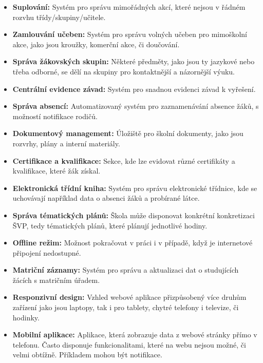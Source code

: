\documentclass[FM,Proj]{tulthesis}
\begin{document}
\begin{itemize}
    \item \textbf{Suplování:} Systém pro správu mimořádných akcí, které nejsou v řádném rozvhu třídy/skupiny/učitele.
    
    \item \textbf{Zamlouvání učeben:} Systém pro správu volných učeben pro mimoškolní akce, jako jsou kroužky, komerční
    akce, či doučování.
    
    \item \textbf{Správa žákovských skupin:} Některé předměty, jako jsou ty jazykové nebo třeba odborné, se dělí na skupiny pro 
    kontaktnější a názornější výuku.
    
    \item \textbf{Centrální evidence závad:} Systém pro snadnou evidenci závad k vyřešení.

    \item \textbf{Správa absencí:} Automatizovaný systém pro zaznamenávání absence žáků, s možností notifikace rodičů.
    
    \item \textbf{Dokumentový management:} Úložiště pro školní dokumenty, jako jsou rozvrhy, plány a interní materiály.
    
    \item \textbf{Certifikace a kvalifikace:} Sekce, kde lze evidovat různé certifikáty a kvalifikace, které žák získal.

    \item \textbf{Elektronická třídní kniha:} Systém pro správu elektronické třídnice, kde se uchovávají například data 
    o absenci žáků a probírané látce.

    \item \textbf{Správa tématických plánů:} Škola může disponovat konkrétní konkretizaci ŠVP, tedy tématických plánů,
    které plánují jednotlivé hodiny.
    
    \item \textbf{Offline režim:} Možnost pokračovat v práci i v případě, když je internetové připojení nedostupné.

    \item \textbf{Matriční záznamy:} Systém pro správu a aktualizaci dat o studujících žácích s matričním úřadem.

    \item \textbf{Responzivní design:} Vzhled webové aplikace přizpůsobený více druhům zařízení jako jsou laptopy,
    tak i pro tablety, chytré telefony i televize, či hodinky.

    \item \textbf{Mobilní aplikace:} Aplikace, která zobrazuje data z webové stránky přímo v telefonu. Často
    disponuje funkcionalitami, které na webu nejsou možné, či velmi obtížně. Příkladem mohou být notifikace.

\end{itemize}
\end{document}
